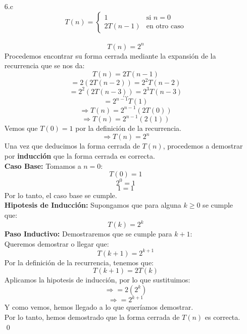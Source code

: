\documentclass[12pt]{article}
\begin{document}
\begin{itemize}
    \item[6.c]
    \[
        T(n) = \left\{ \begin{array}{ll}
        1 & \text{si } n=0\\ 2T(n-1) & \text{en otro caso} \end{array}\right.
    \]
    \\
    \[
        T(n) = 2^n
    \]
    Procedemos encontrar su forma cerrada mediante la expansión de la recurrencia que se nos da:
    \[
        T(n) = 2T(n-1)
    \]
    \[
        = 2(2T(n-2)) = 2^2T(n-  2)
    \]
    \[
        = 2^2(2T(n-3)) = 2^3T(n-3)
    \]
    \[        ...
    \]
    \[        = 2^{n-1}T(1)
    \]
    \[    \Rightarrow T(n) = 2^{n-1}(2T(0))
    \]
    \[    \Rightarrow T(n) = 2^{n-1}(2(1))
    \]
    Vemos que $T(0) = 1$ por la definición de la recurrencia.\\
    \[    \Rightarrow T(n) = 2^n
    \]
    Una vez que deducimos la forma cerrada de $T(n)$, procedemos a demostrar por \textbf{inducción} que la forma cerrada es correcta.\\
    \textbf{Caso Base:} Tomamos a $n = 0$:
    \[
        T(0) = 1
    \]
    \[        2^0 = 1
    \]
    \[        1 = 1
    \]
    Por lo tanto, el caso base se cumple.\\
    \textbf{Hipotesis de Inducción:} Supongamos que para alguna $k \geq 0$ se cumple que:
    \[        T(k) = 2^k
    \]
    \textbf{Paso Inductivo:} Demostraremos que se cumple para $k + 1$:\\
    Queremos demostrar o llegar que: 
    \[        T(k+1) = 2^{k+1}
    \]
    Por la definición de la recurrencia, tenemos que:
    \[        T(k+1) = 2T(k)
    \]
    Aplicamos la hipotesis de inducción, por lo que sustituimos:
    \[    \Rightarrow = 2(2^k)
    \]
    \[        \Rightarrow = 2^{k+1}
    \]
    Y como vemos, hemos llegado a lo que queríamos demostrar.\\
    Por lo tanto, hemos demostrado que la forma cerrada de $T(n)$ es correcta.\\
    \qed


\end{itemize}
\end{document}

